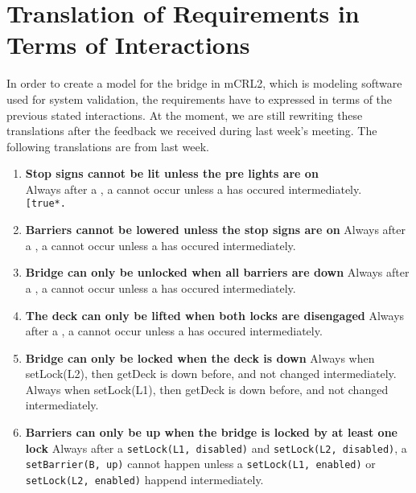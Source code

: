 \section{Translation of Requirements in Terms of Interactions}

In order to create a model for the bridge in mCRL2, which is modeling software used for system validation, the requirements have to expressed in terms of the previous stated interactions. At the moment, we are still rewriting these translations after the feedback we received during last week's meeting. The following translations are from last week.

\begin{enumerate}
	\item \textbf{Stop signs cannot be lit unless the pre lights are on}\\
	Always after a , a  cannot occur unless a 
	 has occured intermediately.\\
	\texttt{[true*.}

	\item \textbf{Barriers cannot be lowered unless the stop signs are on}
	Always after a , a  cannot occur unless a  has occured intermediately.

	\item \textbf{Bridge can only be unlocked when all barriers are down}
	Always after a , a  cannot occur unless a  has occured intermediately.

	\item	\textbf{The deck can only be lifted when both locks are disengaged}
	Always after a , a  cannot occur unless a  has occured intermediately.

	\item \textbf{Bridge can only be locked when the deck is down}
	Always when setLock(L2), then getDeck is down before, and not changed intermediately.
	Always when setLock(L1), then getDeck is down before, and not changed intermediately.

	\item \textbf{Barriers can only be up when the bridge is locked by at least one lock}
	Always after a \texttt{setLock(L1, disabled)} and \texttt{setLock(L2, disabled)}, a \texttt{setBarrier(B, up)} cannot happen unless a \texttt{setLock(L1, enabled)} or \texttt{setLock(L2, enabled)} happend intermediately.


\end{enumerate}
